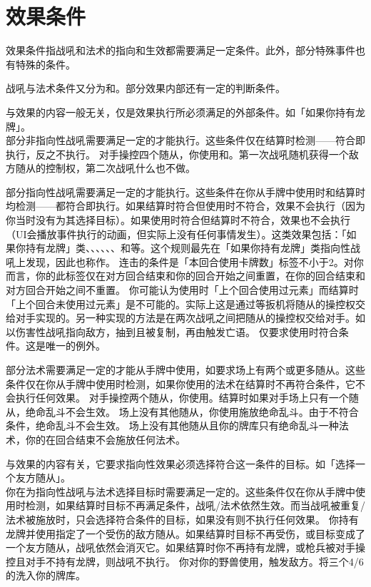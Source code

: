 \section{效果条件}
\label{effect-cond}

效果条件指战吼和法术的指向和生效都需要满足一定条件。此外，部分特殊事件也有特殊的条件。

战吼与法术条件又分为和。部分效果内部还有一定的判断条件。

与效果的内容一般无关，仅是效果执行所必须满足的外部条件。如「如果你持有龙牌」。\\
部分非指向性战吼需要满足一定的才能执行。这些条件仅在结算时检测——符合即执行，反之不执行。
\example 对手操控四个随从，你使用和。第一次战吼随机获得一个敌方随从的控制权，第二次战吼什么也不做。

部分指向性战吼需要满足一定的才能执行。这些条件在你从手牌中使用时和结算时均检测——都符合即执行。如果结算时符合但使用时不符合，效果不会执行（因为你当时没有为其选择目标）。如果使用时符合但结算时不符合，效果也不会执行（UI会播放事件执行的动画，但实际上没有任何事情发生）。这类效果包括：「如果你持有龙牌」类、、、、、、和等。这个规则最先在「如果你持有龙牌」类指向性战吼上发现，因此也称作。
\notice 连击的条件是「本回合使用卡牌数」标签不小于2。对你而言，你的此标签仅在对方回合结束和你的回合开始之间重置，在你的回合结束和对方回合开始之间不重置。
\notice 你可能认为使用时「上个回合使用过元素」而结算时「上个回合未使用过元素」是不可能的。实际上这是通过等扳机将随从的操控权交给对手实现的。另一种实现的方法是在两次战吼之间把随从的操控权交给对手。如以伤害性战吼指向敌方，抽到且被复制，再由触发亡语。
\exception {}仅要求使用时符合条件。这是唯一的例外。

部分法术需要满足一定的才能从手牌中使用，如要求场上有两个或更多随从。这些条件仅在你从手牌中使用时检测，如果你使用的法术在结算时不再符合条件，它不会执行任何效果。
\example 对手操控两个随从，你使用。结算时如果对手场上只有一个随从，绝命乱斗不会生效。
\example 场上没有其他随从，你使用施放绝命乱斗。由于不符合条件，绝命乱斗不会生效。
\example 场上没有其他随从且你的牌库只有绝命乱斗一种法术，你的在回合结束不会施放任何法术。

与效果的内容有关，它要求指向性效果必须选择符合这一条件的目标。如「选择一个友方随从」。\\
你在为指向性战吼与法术选择目标时需要满足一定的。这些条件仅在你从手牌中使用时检测，如果结算时目标不再满足条件，战吼/法术依然生效。而当战吼被重复/法术被施放时，只会选择符合条件的目标，如果没有则不执行任何效果。
\example 你持有龙牌并使用指定了一个受伤的敌方随从。如果结算时目标不再受伤，或目标变成了一个友方随从，战吼依然会消灭它。如果结算时你不再持有龙牌，或枪兵被对手操控且对手不持有龙牌，则战吼不执行。
\example 你对你的野兽使用，触发敌方。将三个4/6的洗入你的牌库。

